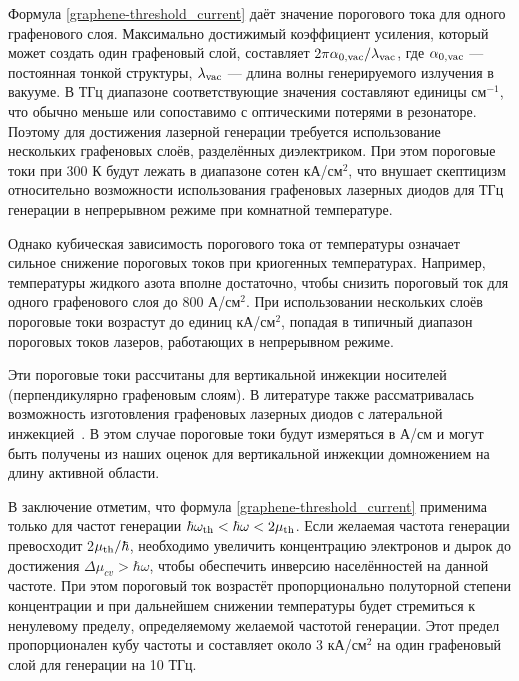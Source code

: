 Формула \eqref{graphene-threshold_current} даёт значение порогового тока для одного графенового слоя. Максимально достижимый коэффициент усиления, который может создать один графеновый слой, составляет $2\pi \alpha_{\rm 0, vac}/ \lambda_{\rm vac}$, где $\alpha_{\rm 0, vac}$ --- постоянная тонкой структуры, $\lambda_{\rm vac}$ --- длина волны генерируемого излучения в вакууме. В ТГц диапазоне соответствующие значения составляют единицы см$^{-1}$, что обычно меньше или сопоставимо с оптическими потерями в резонаторе. Поэтому для достижения лазерной генерации требуется использование нескольких графеновых слоёв, разделённых диэлектриком. При этом пороговые токи при 300 К будут лежать в диапазоне сотен кА/см$^2$, что внушает скептицизм относительно возможности использования графеновых лазерных диодов для ТГц генерации в непрерывном режиме при комнатной температуре.

Однако кубическая зависимость порогового тока от температуры означает сильное снижение пороговых токов при криогенных температурах. Например, температуры жидкого азота вполне достаточно, чтобы снизить пороговый ток для одного графенового слоя до 800 А/см$^2$. При использовании нескольких слоёв пороговые токи возрастут до единиц кА/см$^2$, попадая в типичный диапазон пороговых токов лазеров, работающих в непрерывном режиме.

Эти пороговые токи рассчитаны для вертикальной инжекции носителей (перпендикулярно графеновым слоям). В литературе также рассматривалась возможность изготовления графеновых лазерных диодов с латеральной инжекцией~\cite{graphene-injection_laser_theory}. В этом случае пороговые токи будут измеряться в А/см и могут быть получены из наших оценок для вертикальной инжекции домножением на длину активной области.

В заключение отметим, что формула \eqref{graphene-threshold_current} применима только для частот генерации $\hbar\omega_{\rm th} < \hbar\omega < 2\mu_{\rm th}$. Если желаемая частота генерации превосходит 2$\mu_{\rm th}/\hbar$, необходимо увеличить концентрацию электронов и дырок до достижения $\Delta\mu_{cv} > \hbar\omega$, чтобы обеспечить инверсию населённостей на данной частоте. При этом пороговый ток возрастёт пропорционально полуторной степени концентрации и при дальнейшем снижении температуры будет стремиться к ненулевому пределу, определяемому желаемой частотой генерации. Этот предел пропорционален кубу частоты и составляет около 3 кА/см$^2$ на один графеновый слой для генерации на 10 ТГц.